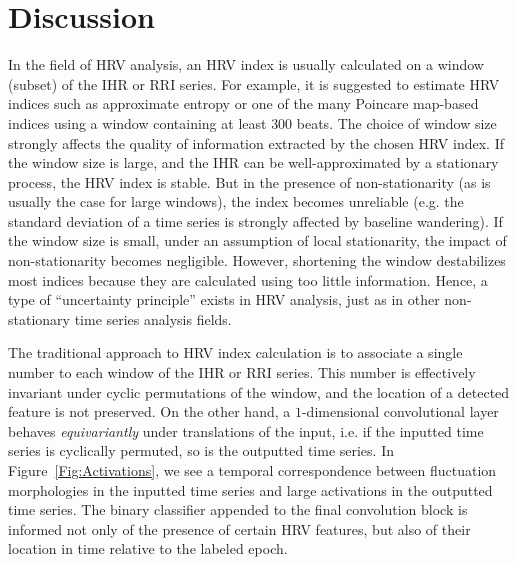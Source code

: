 \documentclass[10pt,a4paper,english]{amsart}
\begin{document}
\section{Discussion}\label{Section:Discussion}
In the field of HRV analysis, an HRV index is usually calculated on a window (subset) of the IHR or RRI series. For example, it is suggested to estimate HRV indices such as approximate entropy \cite{Engoren:1998} or one of the many Poincare map-based indices \cite{Casaseca-de-la-Higuera_Martin-Fernandez_Alberola-Lopez:2006} using a window containing at least $300$ beats. The choice of window size strongly affects the quality of information extracted by the chosen HRV index. If the window size is large, and the IHR can be well-approximated by a stationary process, the HRV index is stable. But in the presence of non-stationarity (as is usually the case for large windows), the index becomes unreliable (e.g. the standard deviation of a time series is strongly affected by baseline wandering). If the window size is small, under an assumption of local stationarity, the impact of non-stationarity becomes negligible. However, shortening the window destabilizes most indices because they are calculated using too little information. Hence, a type of ``uncertainty principle'' exists in HRV analysis, just as in other non-stationary time series analysis fields. 

The traditional approach to HRV index calculation is to associate a single number to each window of the IHR or RRI series. This number is effectively invariant under cyclic permutations of the window, and the location of a detected feature is not preserved. On the other hand, a $1$-dimensional convolutional layer behaves {\em equivariantly} under translations of the input, i.e. if the inputted time series is cyclically permuted, so is the outputted time series. In Figure~\ref{Fig:Activations}, we see a temporal correspondence between fluctuation morphologies in the inputted time series and large activations in the outputted time series.  The binary classifier appended to the final convolution block is informed not only of the presence of certain HRV features, but also of their location in time relative to the labeled epoch. 
\end{document}

